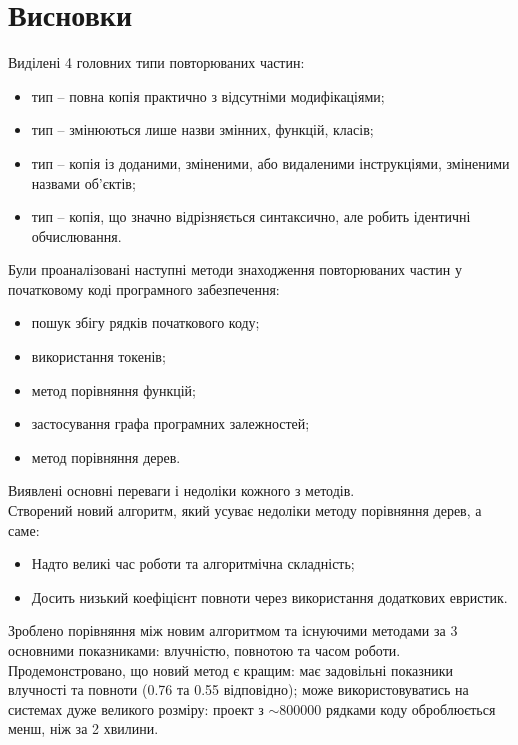 \documentclass[a4paper, 14pt]{article}
\newcommand{\RNum}[1]{\uppercase\expandafter{\romannumeral #1\relax}}
\begin{document}
\section*{Висновки}
Виділені 4 головних типи повторюваних частин:
\begin{itemize}
\item \RNum{1} тип -- повна копія практично з відсутніми модифікаціями;
\item \RNum{2} тип -- змінюються лише назви змінних, функцій, класів;
\item \RNum{3} тип -- копія із доданими, зміненими, або видаленими інструкціями, зміненими назвами об'єктів;
\item \RNum{4} тип -- копія, що значно відрізняється синтаксично, але робить ідентичні обчислювання.
\end{itemize}
Були проаналізовані наступні методи знаходження повторюваних частин у початковому коді програмного забезпечення:
\begin{itemize}
\item пошук збігу рядків початкового коду;
\item використання токенів;
\item метод порівняння функцій;
\item застосування графа програмних залежностей;
\item метод порівняння дерев.
\end{itemize} 
Виявлені основні переваги і недоліки кожного з методів. \\ 
Створений новий алгоритм, який усуває недоліки методу порівняння дерев, а саме:
\begin{itemize}
\item Надто великі час роботи та алгоритмічна складність;
\item Досить низький коефіцієнт повноти через використання додаткових евристик.
\end{itemize}
Зроблено порівняння між новим алгоритмом та існуючими методами за 3 основними показниками: влучністю, повнотою та часом роботи. \\
Продемонстровано, що новий метод є кращим: має задовільні показники влучності та повноти (0.76 та 0.55 відповідно); може використовуватись на системах дуже великого розміру: проект з $\sim$800000 рядками коду оброблюється менш, ніж за 2 хвилини.
\newpage
{}
\printbibliography[title={список використаних джерел}]
\end{document}
